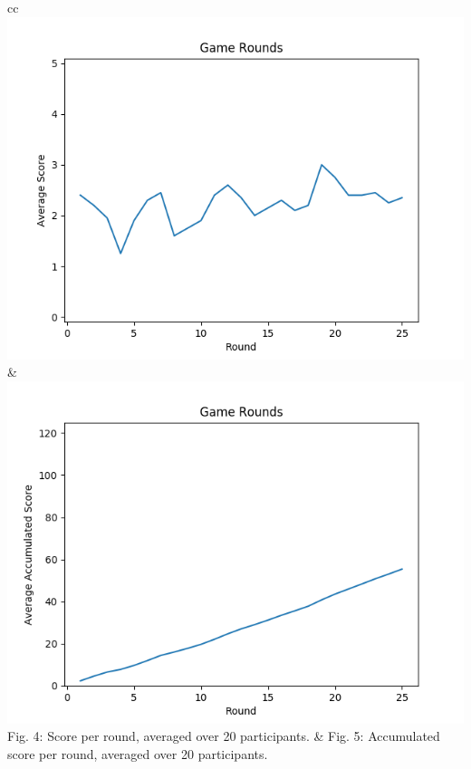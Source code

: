 \documentclass{article}
\begin{document}
\begin{tabular}{cc}
\includegraphics[scale=0.4]{Graficas/Stage2/score.png} &\includegraphics[scale=0.4]{Graficas/Stage2/ac_score.png} \cr 
Fig. 4: Score per round, averaged over 20 participants. & Fig. 5: Accumulated score per round, averaged over 20 participants.\cr

\end{tabular}
\end{document}

